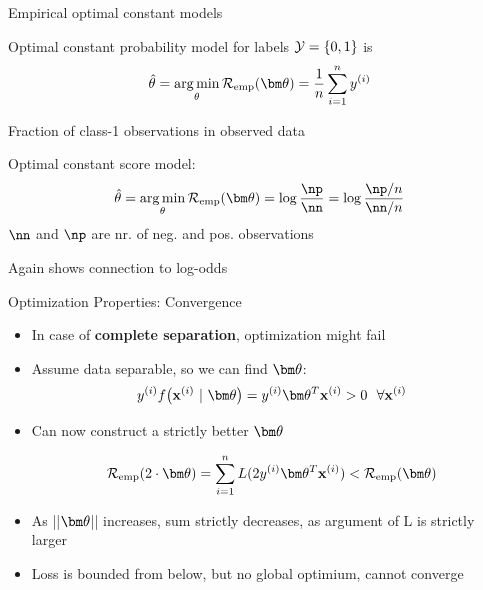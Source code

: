 \documentclass[11pt,compress,t,notes=noshow, xcolor=table]{beamer}
\begin{document}
\begin{framei}[sep=L]{Empirical optimal constant models}

\item Optimal constant probability model for labels $\mathcal{Y} = \{0, 1\}$ is 
$$\thetah = \argmin_{\theta} \risket = \frac{1}{n} \sumin \yi$$
\item Fraction of class-1 observations in observed data
\item Optimal constant score model:
$$\thetah = \argmin_{\theta} \risket = \log \frac{\np}{\nn} = \log \frac{\np / n}{\nn /n}$$ 
$\nn$ and $\np$ are nr.  of neg. and pos. observations
\item Again shows connection to log-odds 


\end{framei}


\begin{framev}[fs=footnotesize]{Optimization Properties: Convergence}


\begin{itemize}

\item In case of \textbf{complete separation}, optimization might 
fail

{
}

\item Assume data separable, so we can find $\thetav$:
$$ \yi \fxit = \yi \thetav^T \xi > 0 ~~ \forall \xi$$

\item Can now construct a strictly better $\thetav$

$$    
\riske(2 \cdot \thetav) = \sumin L ( 2 \yi \thetav^T \xi) < \risket
$$

\item As ||$\thetav$|| increases, sum strictly decreases, as argument of L is strictly larger

\item Loss is bounded from below, but no global optimium, cannot converge
\end{itemize}

\end{framev}
\end{document}
